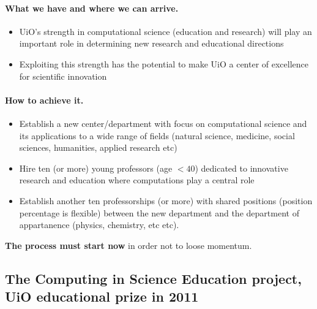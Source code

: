 \documentclass[%
oneside,                 %
final,                   %
10pt]{article}
\begin{document}
\paragraph{What we have and where we can arrive.}
\begin{itemize}
\item UiO's strength in computational science (education and research) will play an important role in  determining new research and educational directions

\item Exploiting this strength has the potential to make UiO a center of excellence for scientific innovation
\end{itemize}

\noindent




\paragraph{How to achieve it.}
\begin{itemize}
\item Establish  a new center/department with focus on computational science and its applications to a wide range of fields (natural science, medicine, social sciences, humanities, applied research etc)

\item Hire ten (or more) young professors (age $< 40$) dedicated to innovative research and education where computations play a central role

\item Establish another ten professorships (or more) with  shared positions (position percentage  is flexible) between the  new department and the department of appartanence (physics, chemistry, etc etc).
\end{itemize}

\noindent



\textbf{The process must start now} in order not to loose momentum.



\subsection{The Computing in Science Education project, UiO educational prize in 2011}

\end{document}
